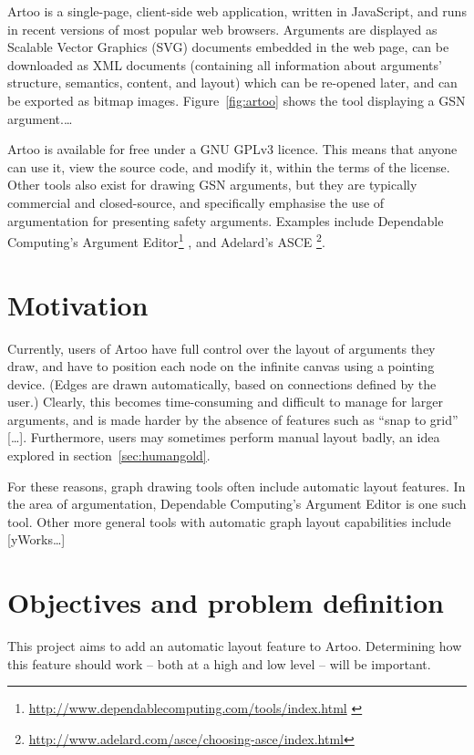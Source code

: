 Artoo is a single-page, client-side web application, written in JavaScript, and runs in recent versions of most popular web browsers.
Arguments are displayed as Scalable Vector Graphics (SVG) documents embedded in the web page, can be downloaded as XML documents (containing all information about arguments' structure, semantics, content, and layout) which can be re-opened later, and can be exported as bitmap images.
Figure~\ref{fig:artoo} shows the tool displaying a GSN argument.\ldots

Artoo is available for free under a GNU GPLv3 licence.
This means that anyone can use it, view the source code, and modify it, within the terms of the license.
Other tools also exist for drawing GSN arguments, but they are typically commercial and closed-source,  and specifically emphasise the use of argumentation for presenting safety arguments.
Examples include Dependable Computing's
Argument Editor\footnote{\url{http://www.dependablecomputing.com/tools/index.html} \label{fn:depcomp}}
, and Adelard's
ASCE \footnote{\url{http://www.adelard.com/asce/choosing-asce/index.html}}.


\section{Motivation}

Currently, users of Artoo have full control over the layout of arguments they draw, and have to position each node on the infinite canvas using a pointing device.
(Edges are drawn automatically, based on connections defined by the user.)
Clearly, this becomes time-consuming and difficult to manage for larger arguments, and is made harder by the absence of features such as ``snap to grid'' [\ldots].
Furthermore, users may sometimes perform manual layout badly, an idea explored in section~\ref{sec:humangold}.

For these reasons, graph drawing tools often include automatic layout features.
In the area of argumentation, Dependable Computing's Argument Editor is one such tool. 
Other more general tools with automatic graph layout capabilities include [yWorks\ldots]


\section{Objectives and problem definition}

This project aims to add an automatic layout feature to Artoo.
Determining how this feature should work -- both at a high and low level -- will be important.

